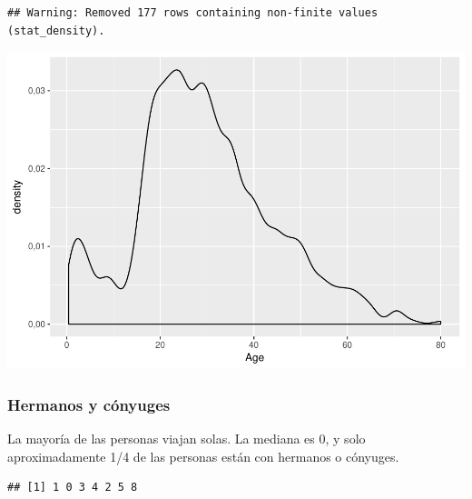 \documentclass[]{article}
\newenvironment{Shaded}{\begin{snugshade}}{\end{snugshade}}
\newcommand{\KeywordTok}[1]{\textcolor[rgb]{0.13,0.29,0.53}{\textbf{#1}}}
\newcommand{\StringTok}[1]{\textcolor[rgb]{0.31,0.60,0.02}{#1}}
\newcommand{\CommentTok}[1]{\textcolor[rgb]{0.56,0.35,0.01}{\textit{#1}}}
\newcommand{\OperatorTok}[1]{\textcolor[rgb]{0.81,0.36,0.00}{\textbf{#1}}}
\newcommand{\NormalTok}[1]{#1}
\begin{document}
\begin{verbatim}
## Warning: Removed 177 rows containing non-finite values (stat_density).
\end{verbatim}

\includegraphics{titanicDataClean_files/figure-latex/var_age-1.pdf}

\subsubsection{Hermanos y cónyuges}\label{hermanos-y-conyuges}

La mayoría de las personas viajan solas. La mediana es 0, y solo
aproximadamente 1/4 de las personas están con hermanos o cónyuges.

\begin{Shaded}
\end{Shaded}

\begin{verbatim}
## [1] 1 0 3 4 2 5 8
\end{verbatim}

\begin{Shaded}
\end{Shaded}
\end{document}
